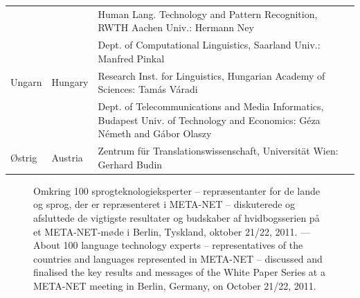 \documentclass[]{../../metanetpaper}
\begin{document}
\begin{longtable}{llp{105mm}}
  & & Human Lang. Technology and Pattern Recognition, RWTH Aachen Univ.: Hermann Ney \\ \addlinespace
  & & Dept. of Computational Linguistics, Saarland Univ.: Manfred Pinkal\\ \addlinespace 
  Ungarn & \textcolor{grey1}{Hungary} & Research Inst. for Linguistics, Hungarian Academy of Sciences: Tamás Váradi\\  \addlinespace
  & & Dept. of Telecommunications and Media Informatics, Budapest Univ. of Technology and Economics: Géza Németh and Gábor Olaszy\\ \addlinespace
  \O strig & \textcolor{grey1}{Austria} & Zentrum für Translationswissenschaft, Universität Wien: Gerhard Budin
\end{longtable}
\normalsize

\renewcommand*{\figureformat}{}
\renewcommand*{\captionformat}{}

\begin{figure}[htbp]
  \center
  \caption{Omkring 100 sprogteknologieksperter -- repr\ae sentanter for de lande og sprog, der er repr\ae senteret i META-NET -- diskuterede og afsluttede de vigtigste resultater og budskaber af hvidbogsserien \mbox{p\aa} et META-NET-m\o de i Berlin, Tyskland, oktober 21/22, 2011. --- \textcolor{grey1}{About 100 language technology experts -- representatives of the countries and languages represented in META-NET -- discussed and finalised the key results and messages of the White Paper Series at a META-NET meeting in Berlin, Germany, on October 21/22, 2011.}}
\end{figure}

\cleardoublepage

\label{whitepaperseries}
\end{document}
